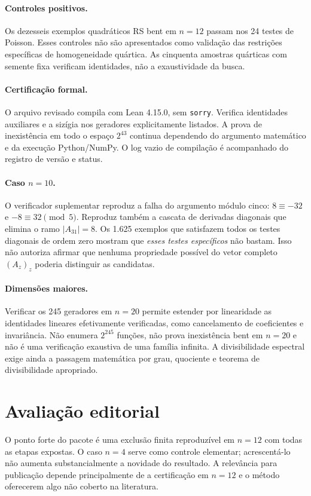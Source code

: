 \documentclass[11pt,a4paper]{article}
\begin{document}
\paragraph{Controles positivos.}
Os dezesseis exemplos quadráticos RS bent em $n=12$ passam nos
24 testes de Poisson. Esses controles não são apresentados como
validação das restrições específicas de homogeneidade quártica.
As cinquenta amostras quárticas com semente fixa verificam identidades,
não a exaustividade da busca.

\paragraph{Certificação formal.}
O arquivo revisado compila com Lean 4.15.0, sem \texttt{sorry}.
Verifica identidades auxiliares e a sizígia nos geradores explicitamente
listados. A prova de inexistência em todo o espaço $2^{43}$ continua
dependendo do argumento matemático e da execução Python/NumPy.
O log vazio de compilação é acompanhado do registro de versão e status.

\paragraph{Caso $n=10$.}
O verificador suplementar reproduz a falha do argumento módulo cinco:
$8\equiv-32$ e $-8\equiv32\pmod5$.
Reproduz também a cascata de derivadas diagonais que elimina o ramo
$|A_{31}|=8$. Os 1.625 exemplos que satisfazem todos os testes diagonais
de ordem zero mostram que \emph{esses testes específicos} não bastam.
Isso não autoriza afirmar que nenhuma propriedade possível do vetor
completo $(A_z)_z$ poderia distinguir as candidatas.

\paragraph{Dimensões maiores.}
Verificar os 245 geradores em $n=20$ permite estender por linearidade
as identidades lineares efetivamente verificadas, como cancelamento
de coeficientes e invariância. Não enumera $2^{245}$ funções, não prova
inexistência bent em $n=20$ e não é uma verificação exaustiva de uma
família infinita. A divisibilidade espectral exige ainda a passagem
matemática por grau, quociente e teorema de divisibilidade apropriado.

\section{Avaliação editorial}
O ponto forte do pacote é uma exclusão finita reproduzível em $n=12$
com todas as etapas expostas. O caso $n=4$ serve como controle elementar;
acrescentá-lo não aumenta substancialmente a novidade do resultado.
A relevância para publicação depende principalmente de a certificação
em $n=12$ e o método oferecerem algo não coberto na literatura.
\end{document}
